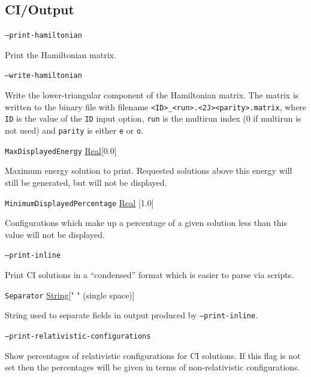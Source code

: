 \documentclass{report}
\begin{document}
\subsection{CI/Output}

\texttt{--print-hamiltonian}
\begin{adjustwidth}{1cm}{}
Print the Hamiltonian matrix. 
\end{adjustwidth}

\texttt{--write-hamiltonian}
\begin{adjustwidth}{1cm}{}
Write the lower-triangular component of the Hamiltonian matrix. The matrix is written to the binary file
with filename \texttt{<ID>\_<run>.<2J><parity>.matrix}, where \texttt{ID} is the value of the 
\texttt{ID} input option, \texttt{run} is the multirun index (0 if multirun is not used) and
\texttt{parity} is either \texttt{e} or \texttt{o}.
\end{adjustwidth}

\texttt{MaxDisplayedEnergy} \uline{Real}[0.0]
\begin{adjustwidth}{1cm}{}
Maximum energy solution to print. Requested solutions above this energy will still be generated, but
will not be displayed.
\end{adjustwidth}

\texttt{MinimumDisplayedPercentage} \uline{Real} [1.0]
\begin{adjustwidth}{1cm}{}
Configurations which make up a percentage of a given solution less than this value will not be
displayed.
\end{adjustwidth}

\texttt{--print-inline}
\begin{adjustwidth}{1cm}{}
Print CI solutions in a ``condensed'' format which is easier to parse via scripts.
\end{adjustwidth}

\texttt{Separator} \uline{String}[" " (single space)]
\begin{adjustwidth}{1cm}{}
String used to separate fields in output produced by \texttt{--print-inline}.
\end{adjustwidth}

\texttt{--print-relativistic-configurations}
\begin{adjustwidth}{1cm}{}
Show percentages of relativistic configurations for CI solutions. If this flag is not set then the
percentages will be given in terms of non-relativistic configurations.
\end{adjustwidth}
\end{document}
